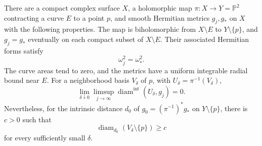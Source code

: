 \begin{example}\label{ex:hermitian-tube-puncture-separation}
There are a compact complex surface $X$, a holomorphic map $\pi\colon X\to Y=\mathbb P^2$ contracting a curve $E$ to a point $p$, and smooth Hermitian metrics $g_j,g_*$ on $X$ with the following properties. The map is biholomorphic from $X\setminus E$ to $Y\setminus\{p\}$, and $g_j=g_*$ eventually on each compact subset of $X\setminus E$. Their associated Hermitian forms satisfy
\[
 \omega_j^2=\omega_*^2.
\]
The curve areas tend to zero, and the metrics have a uniform integrable radial bound near $E$. For a neighborhood basis $V_\delta$ of $p$, with $U_\delta=\pi^{-1}(V_\delta)$,
\[
 \lim_{\delta\downarrow0}\limsup_{j\to\infty}
       \operatorname{diam}^{\mathrm{int}}(U_\delta,g_j)=0.
\]
Nevertheless, for the intrinsic distance $d_0$ of $g_0=(\pi^{-1})^*g_*$ on $Y\setminus\{p\}$, there is $c>0$ such that
\[
 \operatorname{diam}_{d_0}(V_\delta\setminus\{p\})\geq c
\]
for every sufficiently small $\delta$.
\end{example}
